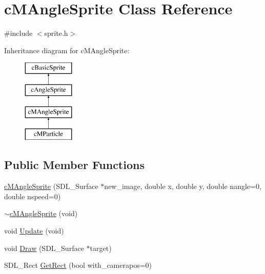 \hypertarget{classc_m_angle_sprite}{\section{c\-M\-Angle\-Sprite Class Reference}
\label{classc_m_angle_sprite}
}


{\ttfamily \#include $<$sprite.\-h$>$}

Inheritance diagram for c\-M\-Angle\-Sprite\-:\begin{figure}[H]
\begin{center}
\leavevmode
\includegraphics[height=4.000000cm]{classc_m_angle_sprite}
\end{center}
\end{figure}
\subsection*{Public Member Functions}
\begin{DoxyCompactItemize}
\item 
\hyperlink{classc_m_angle_sprite_abe168ace1cc60f06914ef8cf5879aaf2}{c\-M\-Angle\-Sprite} (S\-D\-L\-\_\-\-Surface $\ast$new\-\_\-image, double x, double y, double nangle=0, double nspeed=0)
\item 
\hyperlink{classc_m_angle_sprite_a10555be043595294d0cd31dda412a1dc}{$\sim$c\-M\-Angle\-Sprite} (void)
\item 
void \hyperlink{classc_m_angle_sprite_a42facb500fb312966e8babe1e9f00956}{Update} (void)
\item 
void \hyperlink{classc_m_angle_sprite_a8f2392017072fe99b8abec0230eadfc5}{Draw} (S\-D\-L\-\_\-\-Surface $\ast$target)
\item 
S\-D\-L\-\_\-\-Rect \hyperlink{classc_m_angle_sprite_a0a510f4a1d7eee1765c4659381d95f09}{Get\-Rect} (bool with\-\_\-camerapos=0)
\end{DoxyCompactItemize}
